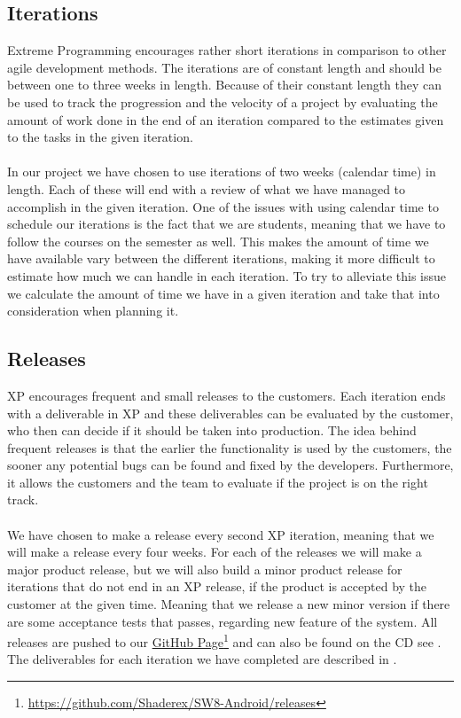 \subsection{Iterations}
\label{sub:iterations}
Extreme Programming encourages rather short iterations in comparison to other agile development methods. The iterations are of constant length and should be between one to three weeks in length. Because of their constant length they can be used to track the progression and the velocity of a project by evaluating the amount of work done in the end of an iteration compared to the estimates given to the tasks in the given iteration. 
\\\\
In our project we have chosen to use iterations of two weeks (calendar time) in length. Each of these will end with a review of what we have managed to accomplish in the given iteration. One of the issues with using calendar time to schedule our iterations is the fact that we are students, meaning that we have to follow the courses on the semester as well. This makes the amount of time we have available vary between the different iterations, making it more difficult to estimate how much we can handle in each iteration. To try to alleviate this issue we calculate the amount of time we have in a given iteration and take that into consideration when planning it. 

\subsection{Releases}
XP encourages frequent and small releases to the customers. Each iteration ends with a deliverable in XP and these deliverables can be evaluated by the customer, who then can decide if it should be taken into production. The idea behind frequent releases is that the earlier the functionality is used by the customers, the sooner any potential bugs can be found and fixed by the developers. Furthermore, it allows the customers and the team to evaluate if the project is on the right track.
\\\\
We have chosen to make a release every second XP iteration, meaning that we will make a release every four weeks. For each of the releases we will make a major product release, but we will also build a minor product release for iterations that do not end in an XP release, if the product is accepted by the customer at the given time. Meaning that we release a new minor version if there are some acceptance tests that passes, regarding new feature of the system. All releases are pushed to our \href{https://github.com/Shaderex/SW8-Android/releases}{GitHub Page}\footnote{\url{https://github.com/Shaderex/SW8-Android/releases}} and can also be found on the CD see . The deliverables for each iteration we have completed are described in . 

